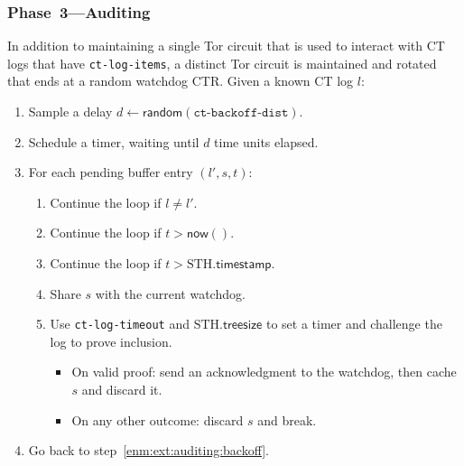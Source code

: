 \subsubsection{Phase~3---Auditing} \label{sec:auditor:design:phase3}
In addition to maintaining a single Tor circuit that is used to interact with
CT logs that have \texttt{ct-log-items}, a distinct Tor circuit is maintained
and rotated that ends at a random watchdog CTR.  Given a known CT log
$l$:
\begin{enumerate}
	\item\label{enm:ext:auditing:backoff} Sample a delay $d \gets
		\mathsf{random}(\texttt{ct-backoff-dist})$.
	\item\label{enm:ext:auditing:sleep} Schedule a timer, waiting until $d$
		time units elapsed.
	\item\label{enm:auditing:loop} For each pending buffer entry $(l',s,t)$:
		\begin{enumerate}
			\item\label{enm:ext:auditing:log-check}
				Continue the loop if $l\ne l'$.
			\item\label{enm:ext:auditing:timestamp-check} Continue the loop if
				$t > \mathsf{now}()$.
			\item\label{enm:ext:auditing:sth-check} Continue the loop if $t >
				\textrm{STH}.\mathsf{timestamp}$.
			\item\label{enm:ext:auditing:watchdog} Share $s$ with the current
				watchdog.
			\item\label{enm:ext:auditing:challenge} Use \texttt{ct-log-timeout}
				and $\textrm{STH}.\mathsf{treesize}$ to set a timer and
				challenge the log to prove inclusion.
				\begin{itemize}
					\item\label{enm:ext:auditing:challenge:success} On valid
						proof: send an acknowledgment to the watchdog, then
						cache $s$ and discard it.
					\item\label{enm:ext:auditing:challenge:fail} On any other
						outcome: discard $s$ and break.
				\end{itemize}
		\end{enumerate}
	\item\label{enm:ext:auditing:restart} Go back to
		step~\ref{enm:ext:auditing:backoff}.
\end{enumerate}

